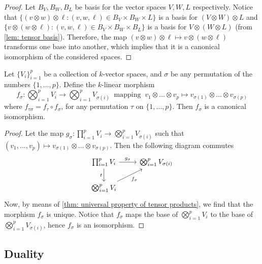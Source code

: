 \begin{proof}
  Let \(B_V, B_W, B_L\) be basis for the vector spaces \(V, W, L\) respectively.
  Notice that \(\{(v \otimes w) \otimes \ell : (v, w, \ell) \in B_V \times B_W
  \times L\}\) is a basis for \((V \otimes W) \otimes L\) and \(\{v \otimes (w
  \otimes \ell) : (v, w, \ell) \in B_V \times B_W \times B_L\}\) is a basis for
  \(V \otimes (W \otimes L)\) (from \cref{lem: tensor basis}). Therefore, the
  map \((v \otimes w) \otimes \ell \mapsto v \otimes (w \otimes \ell)\)
  transforms one base into another, which implies that it is a canonical
  isomorphism of the considered spaces.
\end{proof}

\begin{proposition}[Commutativity]\label{prop: commutativity tensor prod}
  Let \(\{V_i\}_{i=1}^p\) be a collection of \(k\)-vector spaces, and \(\sigma\)
  be any permutation of the numbers \(\{1, \dots, p\}\). Define the \(k\)-linear
  morphism
  \[
    f_\sigma : \bigotimes_{i=1}^p V_i \to \bigotimes_{i=1}^p V_{\sigma(i)}\
    \text{ mapping }\ v_1 \otimes \dots \otimes v_p \mapsto v_{\sigma(1)}
    \otimes \dots \otimes v_{\sigma(p)}
  \]
  where \(f_{\tau\sigma} = f_\tau \circ f_\sigma\), for any permutation \(\tau\)
  on \(\{1, \dots, p\}\). Then \(f_\sigma\) is a canonical isomorphism.
\end{proposition}

\begin{proof}
  Let the map \(g_\sigma: \prod_{i=1}^p V_i \to \bigotimes_{i=1}^p
  V_{\sigma(i)}\) such that \((v_1, \dots, v_p) \mapsto v_{\sigma(1)} \otimes
  \dots \otimes v_{\sigma(p)}\). Then the following diagram commutes
  \[
    \begin{tikzcd}
      \prod_{i=1}^p V_i \ar[r, "g_\sigma"] \ar[d, swap, "t"]
        &\bigotimes_{i=1}^p V_{\sigma(i)}\\
      \bigotimes_{i=1}^p V_i \ar[ur, swap, "f_\sigma"]
    \end{tikzcd}
  \]
  Now, by means of \cref{thm: universal property of tensor products}, we find
  that the morphism \(f_\sigma\) is unique. Notice that \(f_\sigma\) maps the
  base of \(\bigotimes_{i=1}^p V_i\) to the base of \(\bigotimes_{i=1}^p
  V_{\sigma(i)}\), hence \(f_\sigma\) is an isomorphism.
\end{proof}

\subsection{Duality}

